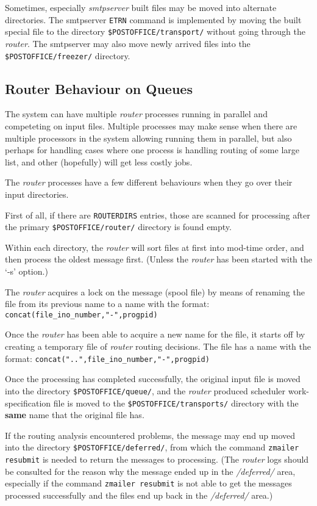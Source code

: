 Sometimes, especially {\em smtpserver} built files may be moved
into alternate directories. The smtpserver {\tt ETRN}
command is implemented by moving the built special file to the 
directory {\tt \$POSTOFFICE/transport/} without going through the
{\em router}.  The smtpserver may also move newly arrived
files into the {\tt \$POSTOFFICE/freezer/} directory.




\subsection{Router Behaviour on Queues}

The system can have multiple {\em router} processes running in parallel
and competeting on input files.  Multiple processes may make sense when
there are multiple processors in the system allowing running them in
parallel, but also perhaps for handling cases where one process is handling
routing of some large list, and other (hopefully) will get less costly jobs.

The {\em router} processes have a few different behaviours when
they go over their input directories.

First of all, if there are {\tt ROUTERDIRS} entries, those
are scanned for processing after the primary 
{\tt \$POSTOFFICE/router/} directory is found empty.

Within each directory, the {\em router} will sort files at first into 
mod-time order, and then process the oldest message first. (Unless the 
{\em router} has been started with the `-s' option.)

The {\em router} acquires a lock on the message (spool file) by means
of renaming the file from its previous name to a name with the format: 
{\small\tt concat(file\_ino\_number,"-",progpid)}

Once the {\em router} has been able to acquire a new name
for the file, it starts off by creating a temporary file of
{\em router} routing decisions.  The file has a name with the format:
{\small\tt concat("..",file\_ino\_number,"-",progpid)}

Once the processing has completed successfully, the original
input file is moved into the directory {\tt \$POSTOFFICE/queue/}, and
the {\em router} produced scheduler work-specification file is moved
to the {\tt \$POSTOFFICE/transports/} directory with the {\bf same}
name that the original file has.

If the routing analysis encountered problems, the message
may end up moved into the directory {\tt \$POSTOFFICE/deferred/}, from
which the command {\tt zmailer resubmit} is needed to return 
the messages to processing. (The {\em router} logs should be consulted 
for the reason why the message ended up in the {\em /deferred/} area,
especially if the command {\tt zmailer resubmit} is not able
to get the messages processed successfully and
the files end up back in the {\em /deferred/} area.)

